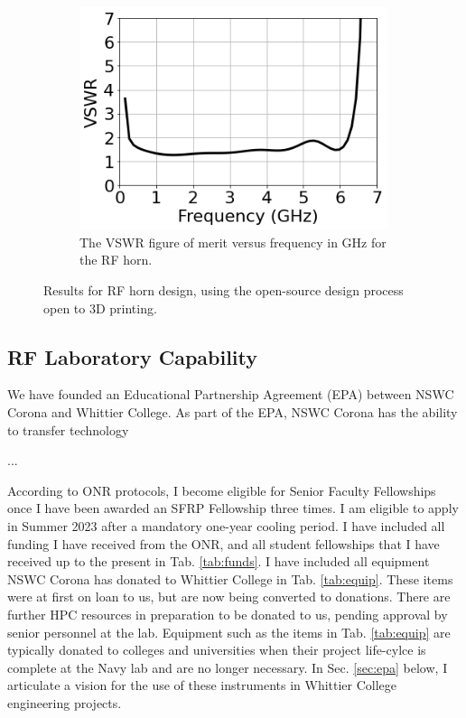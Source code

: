 \documentclass[../../main.tex]{subfiles}
\begin{document}
\begin{figure}
\begin{subfigure}{0.65\textwidth}
\end{subfigure}
\hfill
\begin{subfigure}{0.3\textwidth}
    \includegraphics[width=0.99\textwidth]{figures/vswr.png}
	\caption{The VSWR figure of merit versus frequency in GHz for the RF horn.}
\end{subfigure}
\caption{Results for RF horn design, using the open-source design process open to 3D printing.}
\label{fig:3d_cad}
\end{figure}

\subsection{RF Laboratory Capability}

We have founded an Educational Partnership Agreement (EPA) between NSWC Corona and Whittier College.  As part of the EPA, NSWC Corona has the ability to transfer technology 

...

According to ONR protocols, I become eligible for Senior Faculty Fellowships once I have been awarded an SFRP Fellowship three times.  I am eligible to apply in Summer 2023 after a mandatory one-year cooling period.  I have included all funding I have received from the ONR, and all student fellowships that I have received up to the present in Tab. \ref{tab:funds}.  I have included all equipment NSWC Corona has donated to Whittier College in Tab. \ref{tab:equip}.  These items were at first on loan to us, but are now being converted to donations.  There are further HPC resources in preparation to be donated to us, pending approval by senior personnel at the lab.  Equipment such as the items in Tab. \ref{tab:equip} are typically donated to colleges and universities when their project life-cylce is complete at the Navy lab and are no longer necessary.  In Sec. \ref{sec:epa} below, I articulate a vision for the use of these instruments in Whittier College engineering projects.
\end{document}

